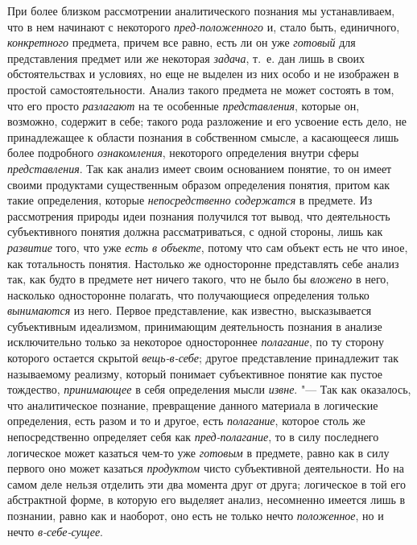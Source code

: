 {{При более близком рассмотрении аналитического познания мы
устанавливаем, что в нем начинают с некоторого
{\em пред-положенного}
и, стало быть, единичного,
{\em конкретного}
предмета, причем все равно, есть ли он уже
{\em готовый} для
представления предмет или же некоторая
{\em задача}, т.~е. дан
лишь в своих обстоятельствах и условиях, но еще не выделен из них особо и
не изображен в простой самостоятельности. Анализ такого предмета не может
состоять в том, что его просто
{\em разлагают} на те
особенные {\em представления},
которые он, возможно, содержит в себе; такого рода разложение
и его усвоение есть дело, не принадлежащее к области познания в собственном
смысле, а касающееся лишь более подробного
{\em ознакомления},
некоторого определения внутри сферы
{\em представления}. Так
как анализ имеет своим основанием понятие, то он имеет своими продуктами
существенным образом определения понятия, притом как такие определения,
которые {\em непосредственно
содержатся} в предмете. Из рассмотрения природы идеи
познания получился тот вывод, что деятельность субъективного понятия должна
рассматриваться, с одной стороны, лишь как
{\em развитие} того, что
уже {\em есть в объекте},
потому что сам объект есть не что иное, как тотальность
понятия. Настолько же односторонне представлять себе анализ так, как будто
в предмете нет ничего такого, что не было бы
{\em вложено} в него,
насколько односторонне полагать, что получающиеся определения
только {\em вынимаются}
из него. Первое представление, как известно, высказывается
субъективным идеализмом, принимающим деятельность познания в анализе
исключительно только за некоторое одностороннее
{\em полагание}, по ту
сторону которого остается скрытой
{\em вещь-в-себе}; другое
представление принадлежит так называемому реализму, который понимает
субъективное понятие как пустое тождество,
{\em принимающее} в себя
определения мысли {\em извне}. "---
Так как оказалось, что аналитическое познание, превращение
данного материала в логические определения, есть разом и то и другое, есть
{\em полагание}, которое
столь же непосредственно определяет себя как
{\em пред-полагание}, то
в силу последнего логическое может казаться чем-то уже
{\em готовым} в предмете,
равно как в силу первого оно может казаться
{\em продуктом} чисто
субъективной деятельности. Но на самом деле нельзя отделить эти два момента
друг от друга; логическое в той его абстрактной форме, в которую его
выделяет анализ, несомненно имеется лишь в познании, равно как и наоборот,
оно есть не только нечто
{\em положенное}, но и
нечто {\em в-себе-сущее}.

}}
